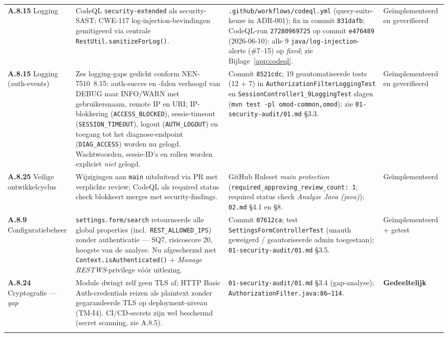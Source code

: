\documentclass[12pt, a4paper]{report}
\newcommand{\amber}[1]{\textcolor{ragAmber}{\textbf{#1}}}
\begin{document}
{\begin{longtable}{@{}
    >{\raggedright\arraybackslash}p{2.0cm}
    >{\raggedright\arraybackslash}p{4.3cm}
    >{\raggedright\arraybackslash}p{6.2cm}
    >{\raggedright\arraybackslash}p{2.0cm}@{}}
\textbf{A.8.15} Logging &
CodeQL \texttt{security-extended} als security-SAST; CWE-117
log-injection-bevindingen gemitigeerd via centrale
\texttt{RestUtil.sanitizeForLog()}. &
\texttt{.github/workflows/codeql.yml} (query-suite-keuze in ADR-001); fix
in commit \texttt{831dafb}; CodeQL-run \texttt{27280969725} op commit
\texttt{e476489} (2026-06-10): alle 9 \texttt{java/log-injection}-alerts
(\#7--15) op \emph{fixed}; zie Bijlage~\ref{app:codeql}. &
Geïmplementeerd en geverifieerd \\
\addlinespace

\textbf{A.8.15} Logging (auth-events) &
Zes logging-gaps gedicht conform NEN-7510~8.15: auth-succes en -falen
verhoogd van DEBUG naar INFO/WARN met gebruikersnaam, remote IP en URI;
IP-blokkering (\texttt{ACCESS\_BLOCKED}), sessie-timeout
(\texttt{SESSION\_TIMEOUT}), logout (\texttt{AUTH\_LOGOUT}) en toegang tot
het diagnose-endpoint (\texttt{DIAG\_ACCESS}) worden nu gelogd.
Wachtwoorden, sessie-ID's en rollen worden expliciet \emph{niet}
gelogd. &
Commit \texttt{8521cdc}; 19 geautomatiseerde tests (12 + 7) in
\texttt{AuthorizationFilterLoggingTest} en
\texttt{SessionController1\_9LoggingTest} slagen (\texttt{mvn test -pl
omod-common,omod}); zie \texttt{01-security-audit/01.md} \S3.3. &
Geïmplementeerd en geverifieerd \\
\addlinespace

\textbf{A.8.25} Veilige ontwikkelcyclus &
Wijzigingen aan \texttt{main} uitsluitend via PR met verplichte review;
CodeQL als required status check blokkeert merges met security-findings. &
GitHub Ruleset \emph{main protection}
(\texttt{required\_approving\_review\_count: 1}; required status check
\emph{Analyze Java (java)}); \texttt{02.md} \S4.1 en \S8. &
Geïmplementeerd \\
\addlinespace

\textbf{A.8.9} Configuratiebeheer &
\texttt{settings.form/search} retourneerde alle global properties (incl.\
\texttt{REST\_ALLOWED\_IPS}) zonder authenticatie --- SQ7, risicoscore 20,
hoogste van de analyse. Nu afgeschermd met \texttt{Context.isAuthenticated()}
+ \emph{Manage RESTWS}-privilege vóór uitlezing. &
Commit \texttt{07612ca}; test \texttt{SettingsFormControllerTest} (unauth
geweigerd / geautoriseerde admin toegestaan);
\texttt{01-security-audit/01.md} \S3.5. &
Geïmplementeerd + getest \\
\addlinespace

\textbf{A.8.24} Cryptografie --- \emph{gap} &
Module dwingt zelf geen TLS af; HTTP Basic Auth-credentials reizen als
plaintext zonder gegarandeerde TLS op deployment-niveau (TM-I4). CI/CD-secrets
zijn wel beschermd (secret scanning, zie A.8.5). &
\texttt{01-security-audit/01.md} \S3.4 (gap-analyse);
\texttt{AuthorizationFilter.java:86--114}. &
\amber{Gedeeltelijk} \\
\addlinespace


\end{longtable}}
\end{document}
